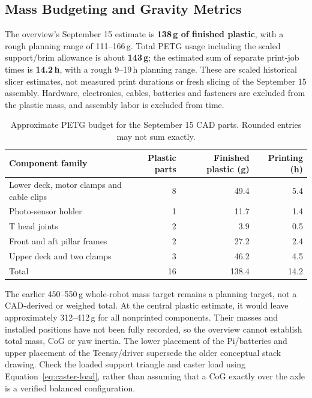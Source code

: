 \subsection{Mass Budgeting and Gravity Metrics}
\label{sec:mass-budget}
The overview's September 15 estimate is \textbf{138\,g of finished plastic}, with a rough planning range of 111--166\,g. Total PETG usage including the scaled support/brim allowance is about \textbf{143\,g}; the estimated sum of separate print-job times is \textbf{14.2\,h}, with a rough 9--19\,h planning range. These are scaled historical slicer estimates, not measured print durations or fresh slicing of the September 15 assembly. Hardware, electronics, cables, batteries and fasteners are excluded from the plastic mass, and assembly labor is excluded from time.

\begin{table}[H]
\centering
\caption{Approximate PETG budget for the September 15 CAD parts. Rounded entries may not sum exactly.}
\label{tab:cad-mass-budget}
\small
\begin{tabular}{lrrr}
\toprule
Component family & Plastic parts & Finished plastic (g) & Printing (h) \\
\midrule
Lower deck, motor clamps and cable clips & 8 & 49.4 & 5.4 \\
Photo-sensor holder & 1 & 11.7 & 1.4 \\
T head joints & 2 & 3.9 & 0.5 \\
Front and aft pillar frames & 2 & 27.2 & 2.4 \\
Upper deck and two clamps & 3 & 46.2 & 4.5 \\
\midrule
Total & 16 & 138.4 & 14.2 \\
\bottomrule
\end{tabular}
\end{table}

The earlier 450--550\,g whole-robot mass target remains a planning target, not a CAD-derived or weighed total. At the central plastic estimate, it would leave approximately 312--412\,g for all nonprinted components. Their masses and installed positions have not been fully recorded, so the overview cannot establish total mass, CoG or yaw inertia. The lower placement of the Pi/batteries and upper placement of the Teensy/driver supersede the older conceptual stack drawing. Check the loaded support triangle and caster load using Equation~\eqref{eq:caster-load}, rather than assuming that a CoG exactly over the axle is a verified balanced configuration.

